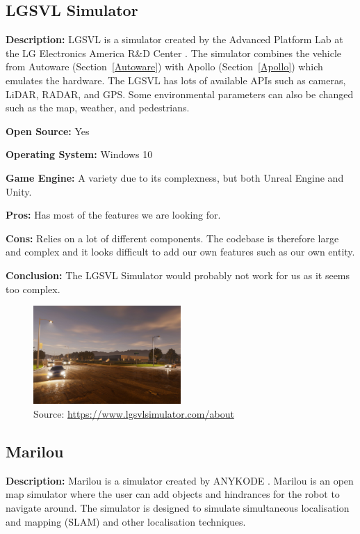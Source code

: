 \subsection{LGSVL Simulator} \label{LGSVL_Simulator}
\textbf{Description:} LGSVL is a simulator created by the Advanced Platform Lab at the LG Electronics America R\&D Center \cite{LGSVL_Web}. The simulator combines the vehicle from Autoware (Section~\ref{Autoware}) with Apollo (Section~\ref{Apollo}) which emulates the hardware. The LGSVL has lots of available APIs such as cameras, LiDAR, RADAR, and GPS. Some environmental parameters can also be changed such as the map, weather, and pedestrians.

\textbf{Open Source:} Yes

\textbf{Operating System:} Windows 10

\textbf{Game Engine:} A variety due to its complexness, but both Unreal Engine and Unity.

\textbf{Pros:} Has most of the features we are looking for.

\textbf{Cons:} Relies on a lot of different components. The codebase is therefore large and complex and it looks difficult to add our own features such as our own entity.

\textbf{Conclusion:} The LGSVL Simulator would probably not work for us as it seems too complex.

\begin{figure}[H]
    \centering
    \includegraphics[width=0.5\textwidth]{Simulators/LGSVL.jpg}
    \caption{Source: \url{https://www.lgsvlsimulator.com/about}}
\end{figure}

\subsection{Marilou}
\textbf{Description:} Marilou is a simulator created by ANYKODE \cite{Marilou_Web}. Marilou is an open map simulator where the user can add objects and hindrances for the robot to navigate around. The simulator is designed to simulate simultaneous localisation and mapping (SLAM) and other localisation techniques. 

